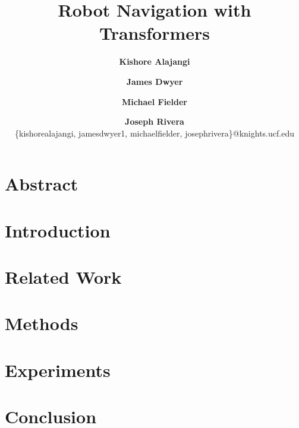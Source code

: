 \documentclass[twocolumn]{article}
\begin{document}
\title{\vspace{-3cm}\textbf{Robot Navigation with Transformers}}
\author{\textbf{Kishore Alajangi} \and \textbf{James Dwyer} \and
        \textbf{Michael Fielder} \and \textbf{Joseph Rivera} \\ 
        \{kishorealajangi, jamesdwyer1, michaelfielder, josephrivera\}@knights.ucf.edu}
\maketitle

\section*{Abstract}\label{sec:abstract}


\section{Introduction}\label{sec:introduction}


\section{Related Work}\label{sec:related}


\section{Methods}\label{sec:methods}
 

\section{Experiments}\label{sec:experiments}
 

\section{Conclusion}\label{sec:conclusion}




\end{document}
